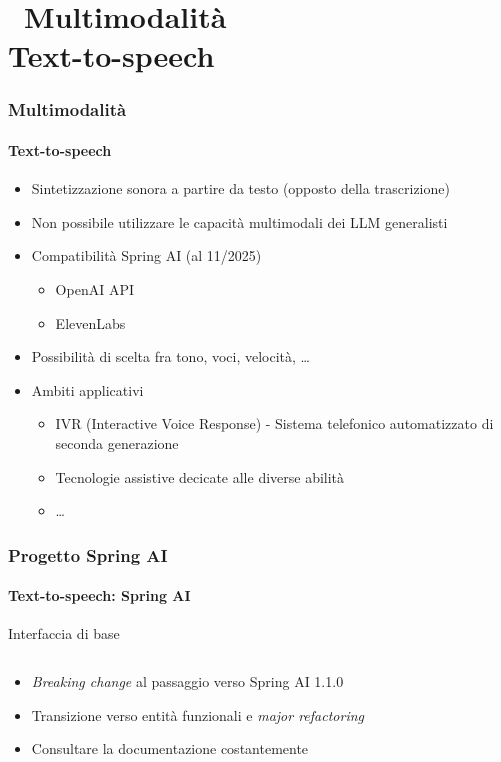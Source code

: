 \section{\faWrench\ Multimodalità\\\small{Text-to-speech}} %
\label{sec:spring-tts}
%
\begin{frame}[t,fragile] \frametitle{Multimodalità}
    \framesubtitle{Text-to-speech}
    {\footnotesize
    \begin{itemize}[leftmargin=10pt,align=right]
        \item[\alert{\faArrowCircleRight}] Sintetizzazione sonora a partire da testo (opposto della trascrizione)
        \item[\alert{\faExclamationTriangle}] Non possibile utilizzare le capacità multimodali dei LLM generalisti
        \item[\alert{\faArrowCircleRight}] Compatibilità Spring AI (al 11/2025)
        \begin{itemize}[leftmargin=10pt,align=right]
            \item[\alert{\faArrowCircleRight}] OpenAI API
            \item[\alert{\faArrowCircleRight}] ElevenLabs
        \end{itemize}
        \item[\alert{\faArrowCircleRight}] Possibilità di scelta fra tono, voci, velocità, \ldots
        \item[\alert{\faArrowCircleRight}] Ambiti applicativi
        \begin{itemize}[leftmargin=10pt,align=right]
            \item[\alert{\faArrowCircleRight}] IVR (Interactive Voice Response) - Sistema telefonico automatizzato di seconda generazione
            \item[\alert{\faArrowCircleRight}] Tecnologie assistive decicate alle diverse abilità
            \item[\alert{\faArrowCircleRight}] \ldots
        \end{itemize}        
    \end{itemize}
    }
\end{frame}   
%
\begin{frame}[t,fragile] \frametitle{Progetto Spring AI}
    \framesubtitle{Text-to-speech: Spring AI}
    	\vspace*{-.7cm}
        \begin{block}{Interfaccia di base}
			{\tiny\inputminted{java}{code/TextToSpeechModel.java}}
    	\end{block}
        \begin{itemize}[leftmargin=10pt,align=right]
            \item[\alert{\faExclamationTriangle}] \textit{Breaking change} al passaggio verso Spring AI 1.1.0
            \item[\alert{\faExclamationTriangle}] Transizione verso entità funzionali e \textit{major refactoring}
            \item[\alert{\faExclamationTriangle}] Consultare la documentazione costantemente
        \end{itemize}         
\end{frame}
